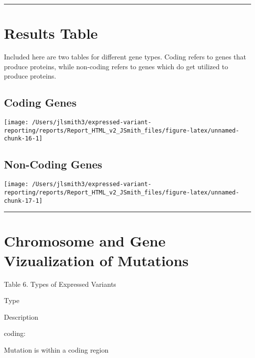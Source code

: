 \documentclass[
]{article}
\begin{document}
\begin{center}\rule{0.5\linewidth}{0.5pt}\end{center}

\hypertarget{results-table}{%
\section{Results Table}\label{results-table}}

Included here are two tables for different gene types. Coding refers to
genes that produce proteins, while non-coding refers to genes which do
get utilized to produce proteins.

\hypertarget{coding-genes}{%
\subsection{Coding Genes}\label{coding-genes}}

\begin{center}\texttt{[image: /Users/jlsmith3/expressed-variant-reporting/reports/Report\_HTML\_v2\_JSmith\_files/figure-latex/unnamed-chunk-16-1]} \end{center}

\hypertarget{non-coding-genes}{%
\subsection{Non-Coding Genes}\label{non-coding-genes}}

\begin{center}\texttt{[image: /Users/jlsmith3/expressed-variant-reporting/reports/Report\_HTML\_v2\_JSmith\_files/figure-latex/unnamed-chunk-17-1]} \end{center}

\begin{center}\rule{0.5\linewidth}{0.5pt}\end{center}

\hypertarget{chromosome-and-gene-vizualization-of-mutations}{%
\section{Chromosome and Gene Vizualization of
Mutations}\label{chromosome-and-gene-vizualization-of-mutations}}

Table 6. Types of Expressed Variants

Type

Description

coding:

Mutation is within a coding region
\end{document}
